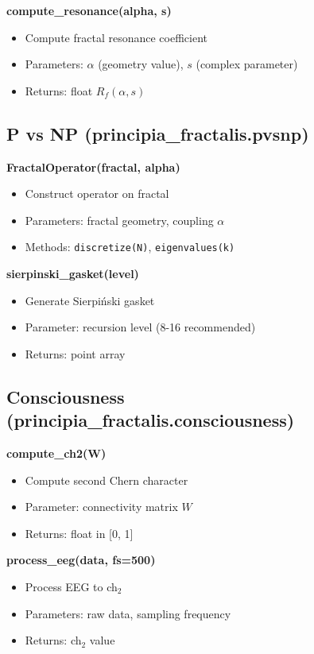 \textbf{compute\_resonance(alpha, s)}
\begin{itemize}
\item Compute fractal resonance coefficient
\item Parameters: $\alpha$ (geometry value), $s$ (complex parameter)
\item Returns: float $R_f(\alpha, s)$
\end{itemize}

\subsection{P vs NP (principia\_fractalis.pvsnp)}

\textbf{FractalOperator(fractal, alpha)}
\begin{itemize}
\item Construct operator on fractal
\item Parameters: fractal geometry, coupling $\alpha$
\item Methods: \texttt{discretize(N)}, \texttt{eigenvalues(k)}
\end{itemize}

\textbf{sierpinski\_gasket(level)}
\begin{itemize}
\item Generate Sierpiński gasket
\item Parameter: recursion level (8-16 recommended)
\item Returns: point array
\end{itemize}

\subsection{Consciousness (principia\_fractalis.consciousness)}

\textbf{compute\_ch2(W)}
\begin{itemize}
\item Compute second Chern character
\item Parameter: connectivity matrix $W$
\item Returns: float in [0, 1]
\end{itemize}

\textbf{process\_eeg(data, fs=500)}
\begin{itemize}
\item Process EEG to ch$_2$
\item Parameters: raw data, sampling frequency
\item Returns: ch$_2$ value
\end{itemize}

